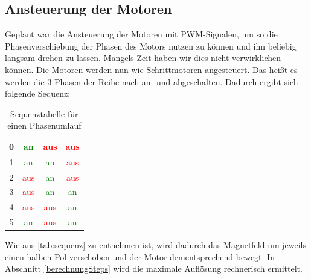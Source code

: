 \documentclass[12pt,a4paper,bibliography=totocnumbered,listof=totocnumbered]{scrartcl}
\begin{document}
\subsection{Ansteuerung der Motoren}
Geplant war die Ansteuerung der Motoren mit PWM-Signalen, um so die Phasenverschiebung der Phasen des Motors nutzen zu können und ihn beliebig langsam drehen zu lassen. Mangels Zeit haben wir dies nicht verwirklichen können. Die Motoren werden nun wie Schrittmotoren angesteuert. Das heißt es werden die 3 Phasen der Reihe nach an- und abgeschalten. Dadurch ergibt sich folgende Sequenz:
\begin{table}[htp] 
	\centering 
		\begin{tabular}{|c|c|c|c|}
			\hline
			0 & \textcolor{green}{an} & \textcolor{red}{aus} & \textcolor{red}{aus}  \\ 
			\hline 
			1 & \textcolor{green}{an} & \textcolor{green}{an} & \textcolor{red}{aus}  \\ 
			\hline 
			2 & \textcolor{red}{aus}  & \textcolor{green}{an} & \textcolor{red}{aus}  \\ 
			\hline 
			3 & \textcolor{red}{aus}  & \textcolor{green}{an} & \textcolor{green}{an} \\ 
			\hline 
			4 & \textcolor{red}{aus}  & \textcolor{red}{aus}  & \textcolor{green}{an} \\ 
			\hline 
			5 & \textcolor{green}{an} & \textcolor{red}{aus}  & \textcolor{green}{an} \\ 
			\hline
		\end{tabular} 
\caption{Sequenztabelle für einen Phasenumlauf} 
\label{tab:sequenz}
\end{table}

Wie aus \autoref{tab:sequenz} zu entnehmen ist, wird dadurch das Magnetfeld um jeweils einen halben Pol verschoben und der Motor dementsprechend bewegt. In Abschnitt \ref{berechnungSteps} wird die maximale Auflösung rechnerisch ermittelt.
\end{document}
